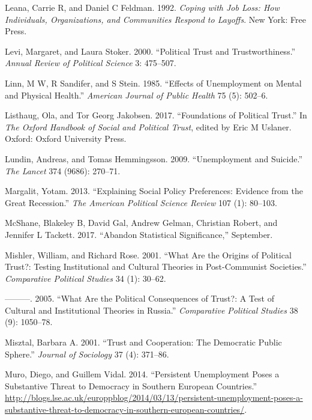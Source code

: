 \documentclass[12pt,]{article}
\begin{document}
\leavevmode\hypertarget{ref-Leana1992-cp}{}%
Leana, Carrie R, and Daniel C Feldman. 1992. \emph{Coping with Job Loss: How Individuals, Organizations, and Communities Respond to Layoffs}. New York: Free Press.

\leavevmode\hypertarget{ref-Levi2000-dx}{}%
Levi, Margaret, and Laura Stoker. 2000. ``Political Trust and Trustworthiness.'' \emph{Annual Review of Political Science} 3: 475--507.

\leavevmode\hypertarget{ref-Linn1985-gi}{}%
Linn, M W, R Sandifer, and S Stein. 1985. ``Effects of Unemployment on Mental and Physical Health.'' \emph{American Journal of Public Health} 75 (5): 502--6.

\leavevmode\hypertarget{ref-Listhaug2017-et}{}%
Listhaug, Ola, and Tor Georg Jakobsen. 2017. ``Foundations of Political Trust.'' In \emph{The Oxford Handbook of Social and Political Trust}, edited by Eric M Uslaner. Oxford: Oxford University Press.

\leavevmode\hypertarget{ref-Lundin2009-gh}{}%
Lundin, Andreas, and Tomas Hemmingsson. 2009. ``Unemployment and Suicide.'' \emph{The Lancet} 374 (9686): 270--71.

\leavevmode\hypertarget{ref-Margalit2013-ph}{}%
Margalit, Yotam. 2013. ``Explaining Social Policy Preferences: Evidence from the Great Recession.'' \emph{The American Political Science Review} 107 (1): 80--103.

\leavevmode\hypertarget{ref-McShane2017-bc}{}%
McShane, Blakeley B, David Gal, Andrew Gelman, Christian Robert, and Jennifer L Tackett. 2017. ``Abandon Statistical Significance,'' September.

\leavevmode\hypertarget{ref-Mishler2001-fp}{}%
Mishler, William, and Richard Rose. 2001. ``What Are the Origins of Political Trust?: Testing Institutional and Cultural Theories in Post-Communist Societies.'' \emph{Comparative Political Studies} 34 (1): 30--62.

\leavevmode\hypertarget{ref-Mishler2005-mk}{}%
---------. 2005. ``What Are the Political Consequences of Trust?: A Test of Cultural and Institutional Theories in Russia.'' \emph{Comparative Political Studies} 38 (9): 1050--78.

\leavevmode\hypertarget{ref-Misztal2001-vv}{}%
Misztal, Barbara A. 2001. ``Trust and Cooperation: The Democratic Public Sphere.'' \emph{Journal of Sociology} 37 (4): 371--86.

\leavevmode\hypertarget{ref-Muro2014-jg}{}%
Muro, Diego, and Guillem Vidal. 2014. ``Persistent Unemployment Poses a Substantive Threat to Democracy in Southern European Countries.'' \url{http://blogs.lse.ac.uk/europpblog/2014/03/13/persistent-unemployment-poses-a-substantive-threat-to-democracy-in-southern-european-countries/}.
\end{document}
